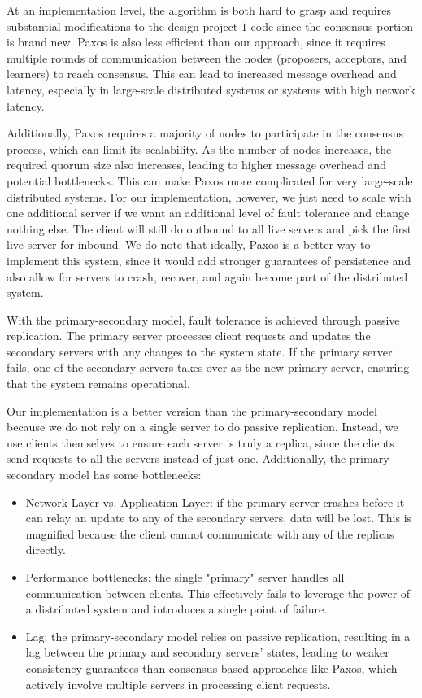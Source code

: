\documentclass[
	a4paper, %
	10pt, %
	unnumberedsections, %
	twoside, %
]{LTJournalArticle}
\begin{document}
At an implementation level, the algorithm is both hard to grasp and requires substantial modifications to the design project $1$ code since the consensus portion is brand new. Paxos is also less efficient than our approach, since it requires multiple rounds of communication between the nodes (proposers, acceptors, and learners) to reach consensus. This can lead to increased message overhead and latency, especially in large-scale distributed systems or systems with high network latency. 

Additionally, Paxos requires a majority of nodes to participate in the consensus process, which can limit its scalability. As the number of nodes increases, the required quorum size also increases, leading to higher message overhead and potential bottlenecks. This can make Paxos more complicated for very large-scale distributed systems. For our implementation, however, we just need to scale with one additional server if we want an additional level of fault tolerance and change nothing else. The client will still do outbound to all live servers and pick the first live server for inbound. We do note that ideally, Paxos is a better way to implement this system, since it would add stronger guarantees of persistence and also allow for servers to crash, recover, and again become part of the distributed system. 

With the primary-secondary model, fault tolerance is achieved through passive replication. The primary server processes client requests and updates the secondary servers with any changes to the system state. If the primary server fails, one of the secondary servers takes over as the new primary server, ensuring that the system remains operational.

Our implementation is a better version than the primary-secondary model because we do not rely on a single server to do passive replication. Instead, we use clients themselves to ensure each server is truly a replica, since the clients send requests to all the servers instead of just one. Additionally, the primary-secondary model has some bottlenecks: 
\begin{itemize}
    \item Network Layer vs. Application Layer: if the primary server crashes before it can relay an update to any of the secondary servers, data will be lost. This is magnified because the client cannot communicate with any of the replicas directly. 
    \item Performance bottlenecks: the single "primary" server handles all communication between clients. This effectively fails to leverage the power of a distributed system and introduces a single point of failure. 
    \item Lag: the primary-secondary model relies on passive replication, resulting in a lag between the primary and secondary servers' states, leading to weaker consistency guarantees than consensus-based approaches like Paxos, which actively involve multiple servers in processing client requests.
\end{itemize}
\end{document}

